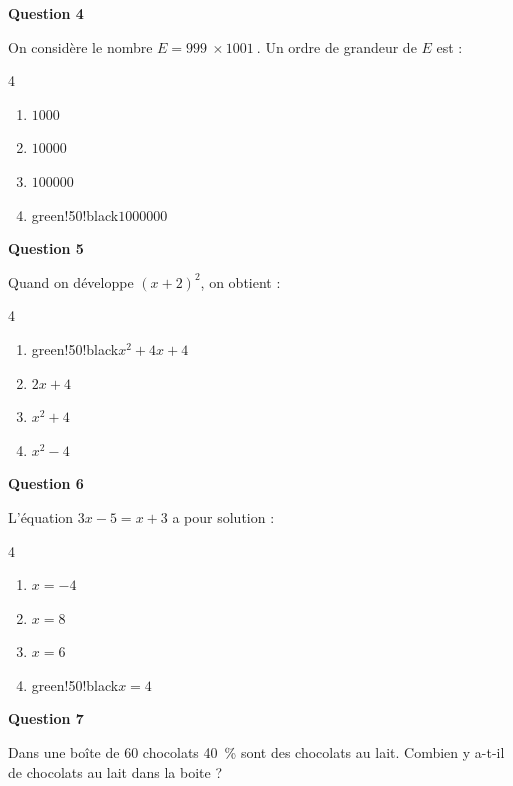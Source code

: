 \documentclass[10pt]{article}
\providecommand{\np}[2][]{{#2~#1}}
\begin{document}
\textbf{Question 4}

On considère le nombre $E = \np{999} \times \np{1001}$. Un ordre de grandeur de $E$ est :

\begin{multicols}{4}
\begin{enumerate}[label=\textbf{\alph* .}]
\item $\np{1000}$
\item $\np{10000}$
\item $\np{100000}$
\item \begin{color}{green!50!black}$\boxed{\np{1000000}}$\end{color}
\end{enumerate}
\end{multicols}

\textbf{Question 5}

Quand on développe $(x+2)^2$, on obtient :

\begin{multicols}{4}
\begin{enumerate}[label=\textbf{\alph* .}]
\item \begin{color}{green!50!black}$\boxed{x^2+4x+4}$\end{color}
\item $2x+4$
\item $x^2+4$
\item $x^2-4$
\end{enumerate}
\end{multicols}

\textbf{Question 6}

L'équation $ 3x - 5 = x + 3 $ a pour solution :

\begin{multicols}{4}
\begin{enumerate}[label=\textbf{\alph* .}]
\item $ x = -4 $
\item $ x = 8 $
\item $ x = 6 $
\item \begin{color}{green!50!black}$\boxed{ x = 4}$\end{color}
\end{enumerate}
\end{multicols}

\textbf{Question 7}

Dans une boîte de 60 chocolats 40~\% sont des chocolats au lait. Combien y a-t-il de chocolats au lait dans la boite ?
\end{document}
